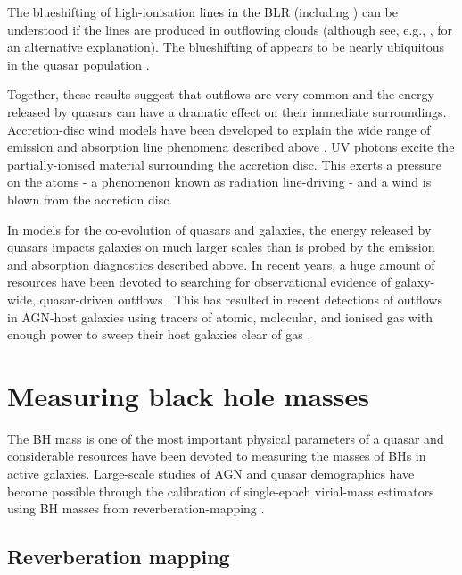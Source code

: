 The blueshifting of high-ionisation lines in the BLR (including ) can be understood if the lines are produced in outflowing clouds (although see, e.g., \citealt{gaskell16}, for an alternative explanation). 
The blueshifting of  appears to be nearly ubiquitous in the quasar population \citep[e.g.][]{richards02,richards11}. 

Together, these results suggest that outflows are very common and the energy released by quasars can have a dramatic effect on their immediate surroundings. 
Accretion-disc wind models have been developed to explain the wide range of emission and absorption line phenomena described above \citep[e.g.][]{murray95,elvis00,proga00,everett05}.
UV photons excite the partially-ionised material surrounding the accretion disc. 
This exerts a pressure on the atoms - a phenomenon known as radiation line-driving - and a wind is blown from the accretion disc. 
  
In models for the co-evolution of quasars and galaxies, the energy released by quasars impacts galaxies on much larger scales than is probed by the emission and absorption diagnostics described above.  
In recent years, a huge amount of resources have been devoted to searching for observational evidence of galaxy-wide, quasar-driven outflows \citep[for recent reviews, see][]{alexander12,fabian12,heckman14}.
This has resulted in recent detections of outflows in AGN-host galaxies using tracers of atomic, molecular, and ionised gas with enough power to sweep their host galaxies clear of gas \citep[e.g.][]{nesvadba06,arav08,nesvadba08,moe09,dunn10,alexander10,harrison12,harrison14,nesvadba10,rupke13,veilleux13,nardini15,feruglio10,alatalo11,cimatti13,cicone14}.  

\section{Measuring black hole masses}

The BH mass is one of the most important physical parameters of a quasar and considerable resources have been devoted to measuring the masses of BHs in active galaxies. 
Large-scale studies of AGN and quasar demographics have become possible through the calibration of single-epoch virial-mass estimators using BH masses from reverberation-mapping \citep[e.g.][]{peterson10,vestergaard11,marziani12,shen13}.  

\subsection{Reverberation mapping}

